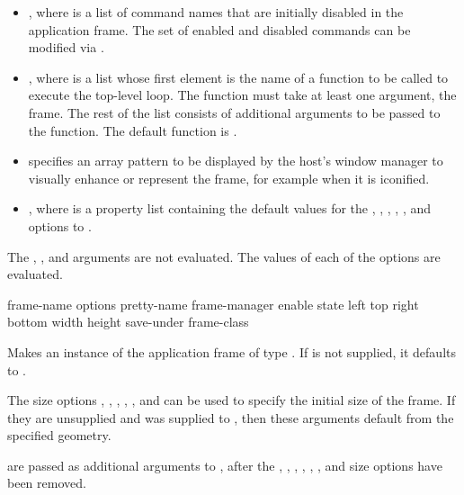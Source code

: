 \begin{itemize}
\item {} , where  is a list of
command names that are initially disabled in the application frame.  The set of
enabled and disabled commands can be modified via .

\item {} , where  is a list whose first
element is the name of a function to be called to execute the top-level loop.
The function must take at least one argument, the frame.  The rest of the list
consists of additional arguments to be passed to the function.  The default
function is .

\item {}  specifies an array pattern to be
displayed by the host's window manager to visually enhance or
represent the frame, for example when it is iconified.

\item {} , where  is a property list
containing the default values for the , , ,
, , and  options to
.
\end{itemize}

The , , and  arguments are not evaluated.
The values of each of the options are evaluated.


 {frame-name \rest options
                                 \key pretty-name
                                      frame-manager enable state
                                      left top right bottom width height
                                      save-under frame-class
                                 \allow}

Makes an instance of the application frame of type .  If
 is not supplied, it defaults to .

The size options , , , , ,
and  can be used to specify the initial size of the frame.  If they
are unsupplied and  was supplied to ,
then these arguments default from the specified geometry.

 are passed as additional arguments to , after
the , , , ,
, , and size options have been removed.


